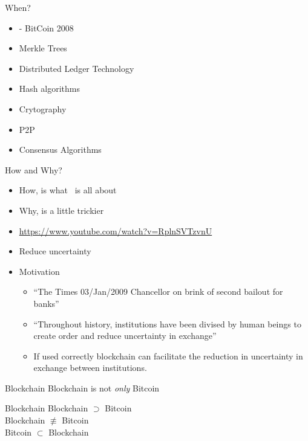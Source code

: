 \documentclass[pdf,table]{beamer}
\begin{document}
\begin{frame}{When?}
	\begin{itemize}
		\item \bitcoinA - BitCoin \cite{nakamoto2008bitcoin} 2008
		\item Merkle Trees
		\item Distributed Ledger Technology
		\item Hash algorithms
		\item Crytography
		\item P2P
		\item Consensus Algorithms
	\end{itemize}
\end{frame}


\begin{frame}{How and Why?}
	\begin{itemize}
		\item How, is what \moduleCode\ is all about
		\item Why, is a little trickier
		\item \url{https://www.youtube.com/watch?v=RplnSVTzvnU}
		\item Reduce uncertainty %
		\item Motivation
			\begin{itemize}
				\item<2-> ``The Times 03/Jan/2009 Chancellor on brink of second bailout for banks''
				\item<3-> ``Throughout history, institutions have been divised by human beings to create order and reduce uncertainty in exchange'' \cite{north1991institutions}
				\item<4-> If used correctly blockchain can facilitate the reduction in uncertainty in exchange between institutions.
			\end{itemize}
	\end{itemize}
\end{frame}


\begin{frame}{Blockchain}
	\centering	
	\fontsize{60}{5}\selectfont
	Blockchain is not \textit{only} Bitcoin
	\normalsize
\end{frame}

\begin{frame}{Blockchain}
	\centering
	\Huge
	Blockchain $\supset$ Bitcoin \\
	\vspace{5mm}
	\pause
	Blockchain $\not\equiv$ Bitcoin \\
	\vspace{5mm}
	\pause
	Bitcoin $\subset$ Blockchain
	\normalsize
\end{frame}
\end{document}
